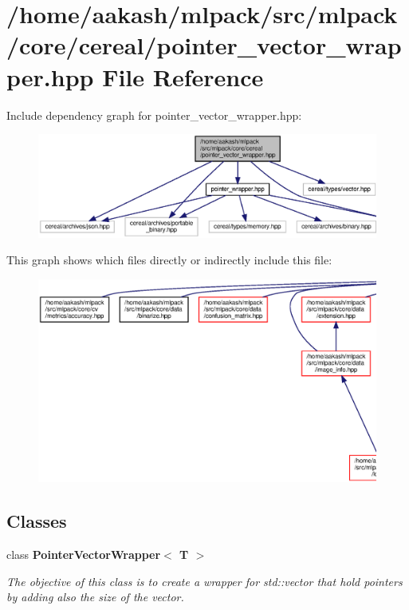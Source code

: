 \section{/home/aakash/mlpack/src/mlpack/core/cereal/pointer\+\_\+vector\+\_\+wrapper.hpp File Reference}
\label{pointer__vector__wrapper_8hpp}
Include dependency graph for pointer\+\_\+vector\+\_\+wrapper.\+hpp\+:
\nopagebreak
\begin{figure}[H]
\begin{center}
\leavevmode
\includegraphics[width=350pt]{pointer__vector__wrapper_8hpp__incl}
\end{center}
\end{figure}
This graph shows which files directly or indirectly include this file\+:
\nopagebreak
\begin{figure}[H]
\begin{center}
\leavevmode
\includegraphics[width=350pt]{pointer__vector__wrapper_8hpp__dep__incl}
\end{center}
\end{figure}
\subsection*{Classes}
\begin{DoxyCompactItemize}
\item 
class \textbf{ Pointer\+Vector\+Wrapper$<$ T $>$}
\begin{DoxyCompactList}\small\item\em The objective of this class is to create a wrapper for std\+::vector that hold pointers by adding also the size of the vector. \end{DoxyCompactList}\end{DoxyCompactItemize}
